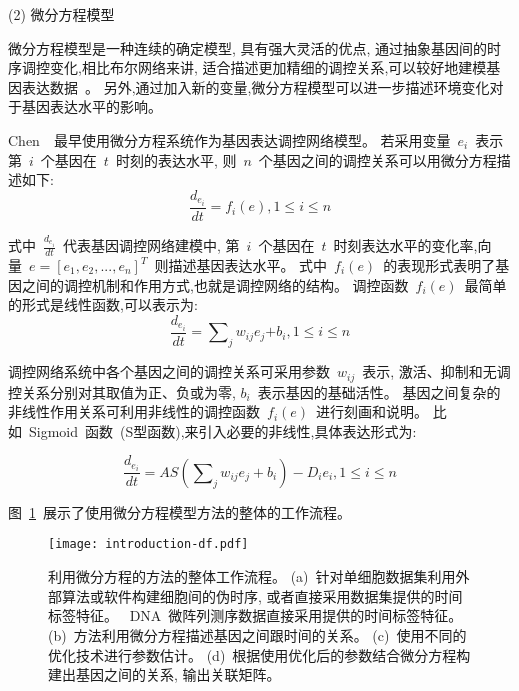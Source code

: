 (2) 微分方程模型

微分方程模型是一种连续的确定模型, 具有强大灵活的优点,
通过抽象基因间的时序调控变化,相比布尔网络来讲, 适合描述更加精细的调控关系,可以较好地建模基因表达数据~\cite{gardner2003inferring,di2005chemogenomic,bansal2006inference, honkela2010model,lu2011high,li2011large}。
另外,通过加入新的变量,微分方程模型可以进一步描述环境变化对于基因表达水平的影响。

Chen~\cite{chen1999modeling}~最早使用微分方程系统作为基因表达调控网络模型。
若采用变量~$e_i$~表示第~$i$~个基因在~$t$~时刻的表达水平, 则~$n$~个基因之间的调控关系可以用微分方程描述如下:
\begin{equation}
\frac{{d_{e_i}}}{{dt}} = f_i (e),1 \le i \le n
\end{equation}

式中~$\frac{{d_{e_i }}}{{dt}}$~代表基因调控网络建模中,
第~$i$~个基因在~$t$~时刻表达水平的变化率,向量~$e=[e_1,e_2,...,e_n]^T$~则描述基因表达水平。
式中~$f_i(e)$~的表现形式表明了基因之间的调控机制和作用方式,也就是调控网络的结构。
调控函数~$f_i(e)$~最简单的形式是线性函数,可以表示为:
\begin{equation}
\frac{{d_{e_i }}}{{dt}} = \sum\nolimits_j {w_{ij} e_j} { + b_i } ,1 \le i \le n
\end{equation}

调控网络系统中各个基因之间的调控关系可采用参数~$w_{ij}$~表示,
激活、抑制和无调控关系分别对其取值为正、负或为零, $b_i$~表示基因的基础活性。
基因之间复杂的非线性作用关系可利用非线性的调控函数~$f_i(e)$~进行刻画和说明。
比如~Sigmoid~函数~(S型函数),来引入必要的非线性,具体表达形式为:

\begin{equation}
\frac{{d_{e_i } }}{{dt}} = AS(\sum\nolimits_j {w_{ij} e_j } + b_i) - D_i e_i ,1 \le i \le n
\end{equation}

图~\ref{fig:pre-df}~展示了使用微分方程模型方法的整体的工作流程。
\begin{figure}[!htbp]
    \centering
    \texttt{[image: introduction-df.pdf]}
    \caption{
        利用微分方程的方法的整体工作流程。
        (a)~针对单细胞数据集利用外部算法或软件构建细胞间的伪时序, 或者直接采用数据集提供的时间标签特征。
        ~DNA~微阵列测序数据直接采用提供的时间标签特征。
        (b)~方法利用微分方程描述基因之间跟时间的关系。
        (c)~使用不同的优化技术进行参数估计。
        (d)~根据使用优化后的参数结合微分方程构建出基因之间的关系, 输出关联矩阵。
    }
    \label{fig:pre-df}
\end{figure}


